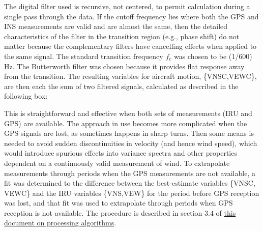 \documentclass[12pt,twoside,english]{article}\usepackage[]{graphicx}\usepackage[]{color}
\let\OrgIndex\index
\renewcommand*{\index}[1]{\OrgIndex{#1}}
\begin{document}
%
The digital filter used is recursive, not centered, to permit calculation during a single pass through the data. If the cutoff frequency lies where both the GPS and INS measurements are valid and are almost the same, then the detailed characteristics of the filter in the transition region (e.g., phase shift) do not matter because the complementary filters have cancelling effects when applied to the same signal. The standard transition frequency $f_{c}$ was chosen to be (1/600) Hz. The Butterworth filter was chosen because it provides flat response away from the transition. The resulting variables for aircraft motion, \{VNSC,VEWC\}, are then each the sum of two filtered signals, calculated as described in the following box:\\ 

This is straightforward and effective when both sets of measurements (IRU and GPS) are available. The approach in use becomes more complicated when the GPS signals are lost, as sometimes happens in sharp turns. Then some means is needed to avoid sudden discontinuities in velocity (and hence wind speed), which would introduce spurious effects into variance spectra and other properties dependent on a continuously valid measurement of wind. To extrapolate measurements through periods when the GPS measurements are not available, a fit was determined to the difference between the best-estimate variables \{VNSC, VEWC\} and the IRU variables \{VNS,VEW\} for the period before GPS reception was lost, and that fit was used to extrapolate through periods when GPS reception is not available. The procedure is described in section 3.4 of \href{https://drive.google.com/file/d/0B1kIUH45ca5ATFV5d3QyQ0JpSjA/view?usp=sharing}{this document on processing algorithms}. 
\end{document}
